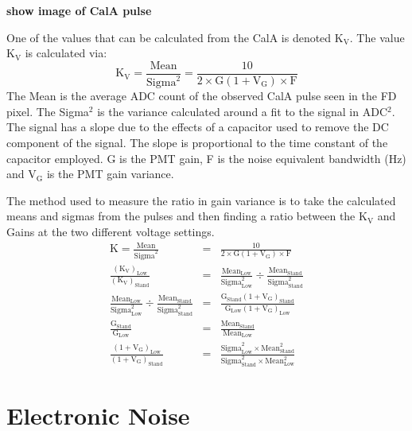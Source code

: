 \textbf{show image of CalA pulse}

One of the values that can be calculated from the CalA is denoted K$_{\mathrm{V}}$. The value K$_{\mathrm{V}}$ is calculated via:
\begin{equation}
\mathrm{K}_{\mathrm{V}} = \frac{\mathrm{Mean}}{\mathrm{Sigma}^2} = \frac{10}{2 \times \mathrm{G} (1 + \mathrm{V}_{\mathrm{G}}) \times \mathrm{F}}
\end{equation}
The Mean is the average ADC count of the observed CalA pulse seen in the FD pixel. The Sigma$^2$ is the variance calculated around a fit to the signal in ADC$^2$. The signal has a slope due to the effects of a capacitor used to remove the DC component of the signal. The slope is proportional to the time constant of the capacitor employed. G is the PMT gain, F is the noise equivalent bandwidth (Hz) and V$_{\mathrm{G}}$ is the PMT gain variance.


The method used to measure the ratio in gain variance is to take the calculated means and sigmas from the pulses and then finding a ratio between the K$_{\mathrm{V}}$ and Gains at the two different voltage settings.
\begin{eqnarray}
\mathrm{K} = \frac{\mathrm{Mean}}{\mathrm{Sigma}^2} &=& \frac{10}{2 \times \mathrm{G} (1 + \mathrm{V}_{\mathrm{G}}) \times \mathrm{F}} \\ 
\frac{\left(\mathrm{K}_{\mathrm{V}}\right)_{\mathrm{Low}}}{\left(\mathrm{K}_{\mathrm{V}}\right)_{\mathrm{Stand}}} &=& \frac{\mathrm{Mean}_{\mathrm{Low}}}{\mathrm{Sigma}^2_{\mathrm{Low}}} \div \frac{\mathrm{Mean}_{\mathrm{Stand}}}{\mathrm{Sigma}^2_{\mathrm{Stand}}} \\ 
\frac{\mathrm{Mean}_{\mathrm{Low}}}{\mathrm{Sigma}^2_{\mathrm{Low}}} \div \frac{\mathrm{Mean}_{\mathrm{Stand}}}{\mathrm{Sigma}^2_{\mathrm{Stand}}} &=& \frac{\mathrm{G}_{\mathrm{Stand}} (1 + \mathrm{V}_{\mathrm{G}})_{\mathrm{Stand}}}{\mathrm{G}_{\mathrm{Low}} (1 + \mathrm{V}_{\mathrm{G}})_{\mathrm{Low}}} \\
\frac{\mathrm{G}_{\mathrm{Stand}}}{\mathrm{G}_{\mathrm{Low}}} &=& \frac{\mathrm{Mean}_{\mathrm{Stand}}}{\mathrm{Mean}_{\mathrm{Low}}} \\
\frac{(1 + \mathrm{V}_{\mathrm{G}})_{\mathrm{Low}}}{(1 + \mathrm{V}_{\mathrm{G}})_{\mathrm{Stand}}} &=& \frac{\mathrm{Sigma}^2_{\mathrm{Low}} \times \mathrm{Mean}^2_{\mathrm{Stand}}}{\mathrm{Sigma}^2_{\mathrm{Stand}} \times \mathrm{Mean}^2_{\mathrm{Low}}}
\end{eqnarray}

\section{Electronic Noise}

